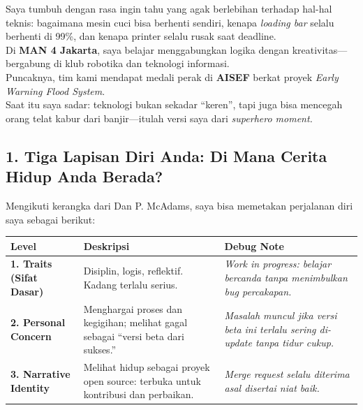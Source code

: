 \documentclass[
  letterpaper,
  DIV=11,
  numbers=noendperiod]{scrreprt}
\begin{document}
Saya tumbuh dengan rasa ingin tahu yang agak berlebihan terhadap hal-hal
teknis: bagaimana mesin cuci bisa berhenti sendiri, kenapa \emph{loading
bar} selalu berhenti di 99\%, dan kenapa printer selalu rusak saat
deadline.\\
Di \textbf{MAN 4 Jakarta}, saya belajar menggabungkan logika dengan
kreativitas---bergabung di klub robotika dan teknologi informasi.\\
Puncaknya, tim kami mendapat medali perak di \textbf{AISEF} berkat
proyek \emph{Early Warning Flood System}.\\
Saat itu saya sadar: teknologi bukan sekadar ``keren'', tapi juga bisa
mencegah orang telat kabur dari banjir---itulah versi saya dari
\emph{superhero moment.}

\subsection{\texorpdfstring{\textbf{1. Tiga Lapisan Diri Anda: Di Mana
Cerita Hidup Anda
Berada?}}{1. Tiga Lapisan Diri Anda: Di Mana Cerita Hidup Anda Berada?}}\label{tiga-lapisan-diri-anda-di-mana-cerita-hidup-anda-berada}

Mengikuti kerangka dari Dan P. McAdams, saya bisa memetakan perjalanan
diri saya sebagai berikut:

\begin{longtable}[]{@{}
  >{\raggedright\arraybackslash}p{}
  >{\raggedright\arraybackslash}p{}
  >{\raggedright\arraybackslash}p{}@{}}
\toprule\noalign{}
\begin{minipage}[b]{\linewidth}\raggedright
Level
\end{minipage} & \begin{minipage}[b]{\linewidth}\raggedright
Deskripsi
\end{minipage} & \begin{minipage}[b]{\linewidth}\raggedright
Debug Note
\end{minipage} \\
\midrule\noalign{}
\endhead
\bottomrule\noalign{}
\endlastfoot
\textbf{1. Traits (Sifat Dasar)} & Disiplin, logis, reflektif. Kadang
terlalu serius. & \emph{Work in progress: belajar bercanda tanpa
menimbulkan bug percakapan.} \\
\textbf{2. Personal Concern} & Menghargai proses dan kegigihan; melihat
gagal sebagai ``versi beta dari sukses.'' & \emph{Masalah muncul jika
versi beta ini terlalu sering di-update tanpa tidur cukup.} \\
\textbf{3. Narrative Identity} & Melihat hidup sebagai proyek open
source: terbuka untuk kontribusi dan perbaikan. & \emph{Merge request
selalu diterima asal disertai niat baik.} \\
\end{longtable}
\end{document}
